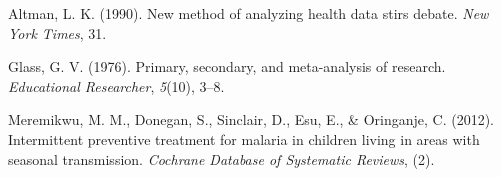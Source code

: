 \documentclass[
  man]{apa6}
\newlength{\cslhangindent}
\newenvironment{CSLReferences}[2] %
 {\begin{list}{}{%
  \setlength{\itemindent}{0pt}
  \setlength{\leftmargin}{0pt}
  \setlength{\parsep}{0pt}
  \ifodd #1
   \setlength{\leftmargin}{\cslhangindent}
   \setlength{\itemindent}{-1\cslhangindent}
  \fi
  \setlength{\itemsep}{#2\baselineskip}}}
 {\end{list}}
\begin{document}
\newpage

\label{refs}
\begin{CSLReferences}{1}{0}
Altman, L. K. (1990). New method of analyzing health data stirs debate. \emph{New York Times}, 31.

Glass, G. V. (1976). Primary, secondary, and meta-analysis of research. \emph{Educational Researcher}, \emph{5}(10), 3--8.

Meremikwu, M. M., Donegan, S., Sinclair, D., Esu, E., \& Oringanje, C. (2012). Intermittent preventive treatment for malaria in children living in areas with seasonal transmission. \emph{Cochrane Database of Systematic Reviews}, (2).

\end{CSLReferences}
\end{document}
